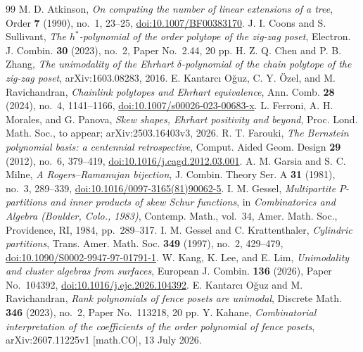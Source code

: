 \documentclass[10pt,a4paper]{amsart}
\begin{document}
\begin{thebibliography}{99}
 M. D. Atkinson, \emph{On computing the number of linear extensions of a tree}, Order \textbf{7} (1990), no.~1, 23--25, \href{https://doi.org/10.1007/BF00383170}{doi:10.1007/BF00383170}.
 J. I. Coons and S. Sullivant, \emph{The \(h^\ast\)-polynomial of the order polytope of the zig-zag poset}, Electron. J. Combin. \textbf{30} (2023), no.~2, Paper No.~2.44, 20 pp.
 H. Z. Q. Chen and P. B. Zhang, \emph{The unimodality of the Ehrhart \(\delta\)-polynomial of the chain polytope of the zig-zag poset}, arXiv:1603.08283, 2016.
 E. Kantarc{\i} O\u{g}uz, C. Y. \"Ozel, and M. Ravichandran, \emph{Chainlink polytopes and Ehrhart equivalence}, Ann. Comb. \textbf{28} (2024), no.~4, 1141--1166, \href{https://doi.org/10.1007/s00026-023-00683-x}{doi:10.1007/s00026-023-00683-x}.
 L. Ferroni, A. H. Morales, and G. Panova, \emph{Skew shapes, Ehrhart positivity and beyond}, Proc. Lond. Math. Soc., to appear; arXiv:2503.16403v3, 2026.
 R. T. Farouki, \emph{The Bernstein polynomial basis: a centennial retrospective}, Comput. Aided Geom. Design \textbf{29} (2012), no.~6, 379--419, \href{https://doi.org/10.1016/j.cagd.2012.03.001}{doi:10.1016/j.cagd.2012.03.001}.
 A. M. Garsia and S. C. Milne, \emph{A Rogers--Ramanujan bijection}, J. Combin. Theory Ser. A \textbf{31} (1981), no.~3, 289--339, \href{https://doi.org/10.1016/0097-3165(81)90062-5}{doi:10.1016/0097-3165(81)90062-5}.
 I. M. Gessel, \emph{Multipartite \(P\)-partitions and inner products of skew Schur functions}, in \emph{Combinatorics and Algebra (Boulder, Colo., 1983)}, Contemp. Math., vol.~34, Amer. Math. Soc., Providence, RI, 1984, pp.~289--317.
 I. M. Gessel and C. Krattenthaler, \emph{Cylindric partitions}, Trans. Amer. Math. Soc. \textbf{349} (1997), no.~2, 429--479, \href{https://doi.org/10.1090/S0002-9947-97-01791-1}{doi:10.1090/S0002-9947-97-01791-1}.
 W. Kang, K. Lee, and E. Lim, \emph{Unimodality and cluster algebras from surfaces}, European J. Combin. \textbf{136} (2026), Paper No.~104392, \href{https://doi.org/10.1016/j.ejc.2026.104392}{doi:10.1016/j.ejc.2026.104392}.
 E. Kantarc{\i} O\u{g}uz and M. Ravichandran, \emph{Rank polynomials of fence posets are unimodal}, Discrete Math. \textbf{346} (2023), no.~2, Paper No.~113218, 20 pp.
 Y. Kahane, \emph{Combinatorial interpretation of the coefficients of the order polynomial of fence posets}, arXiv:2607.11225v1 [math.CO], 13 July 2026.

\end{thebibliography}
\end{document}
